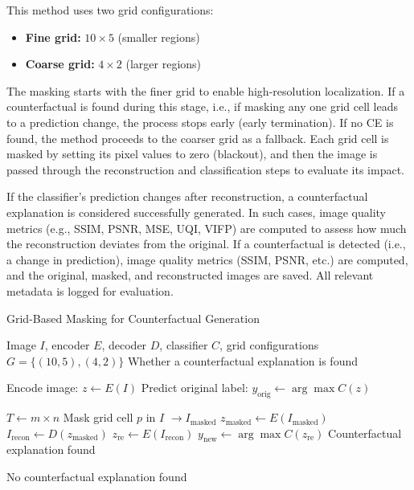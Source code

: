 This method uses two grid configurations:
\begin{itemize}
    \item \textbf{Fine grid:} $10 \times 5$ (smaller regions)
    \item \textbf{Coarse grid:} $4 \times 2$ (larger regions)
\end{itemize}

The masking starts with the finer grid to enable high-resolution localization. If a counterfactual is found during this stage, i.e., if masking any one grid cell leads to a prediction change, the process stops early (early termination). If no CE is found, the method proceeds to the coarser grid as a fallback. Each grid cell is masked by setting its pixel values to zero (blackout), and then the image is passed through the reconstruction and classification steps to evaluate its impact.

If the classifier’s prediction changes after reconstruction, a counterfactual explanation is considered successfully generated. In such cases, image quality metrics (e.g., SSIM, PSNR, MSE, UQI, VIFP) are computed to assess how much the reconstruction deviates from the original. If a counterfactual is detected (i.e., a change in prediction), image quality metrics (SSIM, PSNR, etc.) are computed, and the original, masked, and reconstructed images are saved. All relevant metadata is logged for evaluation.


\vspace{1em}
\begin{algorithm}[H]
\caption{Grid-Based Masking for Counterfactual Generation}
\label{alg:grid_based_masking}
\begin{algorithmic}[1]
\REQUIRE Image $I$, encoder $E$, decoder $D$, classifier $C$, grid configurations $G = \{(10,5), (4,2)\}$
\ENSURE Whether a counterfactual explanation is found

\STATE Encode image: $z \leftarrow E(I)$
\STATE Predict original label: $y_{\text{orig}} \leftarrow \arg\max C(z)$

    \STATE $T \leftarrow m \times n$
        \STATE Mask grid cell $p$ in $I$ $\rightarrow I_{\text{masked}}$
        \STATE $z_{\text{masked}} \leftarrow E(I_{\text{masked}})$
        \STATE $I_{\text{recon}} \leftarrow D(z_{\text{masked}})$
        \STATE $z_{\text{re}} \leftarrow E(I_{\text{recon}})$
        \STATE $y_{\text{new}} \leftarrow \arg\max C(z_{\text{re}})$
            \RETURN Counterfactual explanation found
        \ENDIF
    \ENDFOR
\ENDFOR

\RETURN No counterfactual explanation found
\end{algorithmic}
\end{algorithm}

